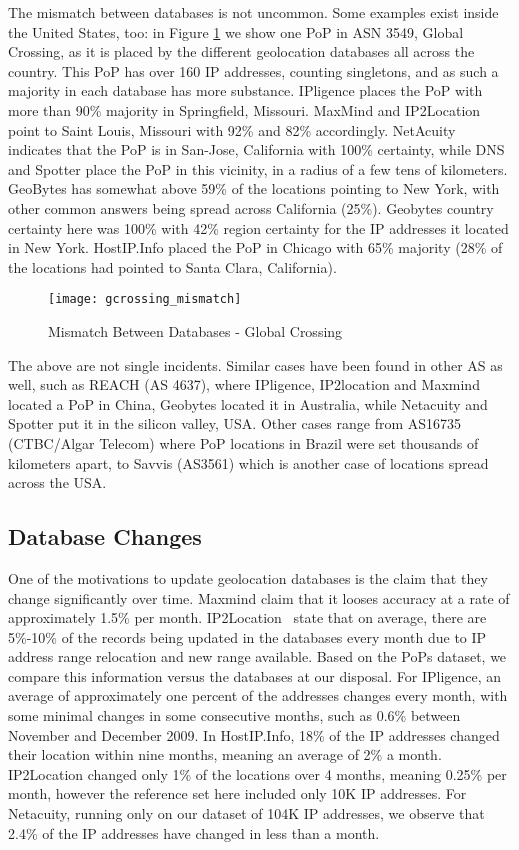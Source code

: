 The mismatch between databases is not uncommon. Some examples exist
inside the United States, too: in Figure
\ref{fig:gcrossing_mismatch} we show one PoP in ASN 3549, Global
Crossing, as it is placed by the different geolocation databases all
across the country. This PoP has over 160 IP addresses, counting
singletons, and as such a majority in each database has more
substance. IPligence places the PoP with more than 90\% majority in
Springfield, Missouri. MaxMind and IP2Location point to Saint Louis,
Missouri with 92\% and 82\% accordingly. NetAcuity indicates that
the PoP is in  San-Jose, California with 100\% certainty, while DNS
and Spotter place the PoP in this vicinity, in a radius of a few
tens of kilometers. GeoBytes has somewhat above 59\% of the
locations pointing to New York, with other common answers being
spread across California (25\%). Geobytes country certainty here was
100\% with 42\% region certainty for the IP addresses it located in
New York. HostIP.Info placed the PoP in Chicago with 65\% majority
(28\% of the locations had pointed to Santa Clara, California).

\begin{figure}
\begin{minipage}[b]{\linewidth}
\centering
\texttt{[image: gcrossing\_mismatch]}
\caption{Mismatch Between Databases - Global Crossing}
\label{fig:gcrossing_mismatch}
\end{minipage}
\end{figure}


The above are not single incidents. Similar cases have been found in
other AS as well, such as REACH (AS 4637), where IPligence,
IP2location and Maxmind located a PoP in China, Geobytes located it
in Australia, while Netacuity and Spotter put it in the silicon
valley, USA. Other cases range from AS16735 (CTBC/Algar Telecom)
where PoP locations in Brazil were set thousands of kilometers
apart, to Savvis (AS3561) which is another case of locations spread
across the USA.

\subsection{Database Changes}
One of the motivations to update geolocation databases is the claim
that they change significantly over time. Maxmind\cite{maxmind}
claim that it looses accuracy at a rate of approximately 1.5\% per
month. IP2Location~\cite{ip2location} state that on average, there
are 5\%-10\% of the records being updated in the databases every
month due to IP address range relocation and new range available.
Based on the PoPs dataset, we compare this information versus the
databases at our disposal. For IPligence, an average of
approximately one percent of the addresses changes every month, with
some minimal changes in some consecutive months, such as 0.6\%
between November and December 2009. In HostIP.Info, 18\% of the IP
addresses changed their location within nine months, meaning an
average of 2\% a month. IP2Location changed only 1\% of the
locations over 4 months, meaning 0.25\% per month, however the
reference set here included only 10K IP addresses. For Netacuity,
running only on our dataset of 104K IP addresses, we observe that
2.4\% of the IP addresses have changed in less than a month.
